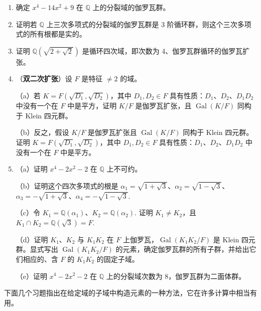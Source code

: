 \begin{enumerate}
\item 确定 \(x^4-14x^2+9\) 在 \(\mathbb{Q}\) 上的分裂域的伽罗瓦群。

\item 证明若 \(\mathbb{Q}\) 上三次多项式的分裂域的伽罗瓦群是 3 阶循环群，则这个三次多项式的所有根都是实的。

\item 证明 \(\mathbb{Q}(\sqrt{2+\sqrt{2}})\) 是循环四次域，即次数为 4、伽罗瓦群循环的伽罗瓦扩张。

\item （\textbf{双二次扩张}）设 \(F\) 是特征 \(\neq 2\) 的域。

（a）若 \(K = F(\sqrt{D_1}, \sqrt{D_2})\)，其中 \(D_1, D_2 \in F\) 具有性质：\(D_1\)、\(D_2\)、\(D_1D_2\) 中没有一个在 \(F\) 中是平方，证明 \(K/F\) 是伽罗瓦扩张，且 \(\operatorname{Gal}(K/F)\) 同构于 Klein 四元群。

（b）反之，假设 \(K/F\) 是伽罗瓦扩张且 \(\operatorname{Gal}(K/F)\) 同构于 Klein 四元群。证明 \(K = F(\sqrt{D_1}, \sqrt{D_2})\)，其中 \(D_1, D_2 \in F\) 具有性质：\(D_1\)、\(D_2\)、\(D_1D_2\) 中没有一个在 \(F\) 中是平方。

\item （a）证明 \(x^4-2x^2-2\) 在 \(\mathbb{Q}\) 上不可约。

（b）证明这个四次多项式的根是 \(\alpha_1 = \sqrt{1+\sqrt{3}}\)、\(\alpha_2 = \sqrt{1-\sqrt{3}}\)、\(\alpha_3 = -\sqrt{1+\sqrt{3}}\)、\(\alpha_4 = -\sqrt{1-\sqrt{3}}\).

（c）令 \(K_1 = \mathbb{Q}(\alpha_1)\)、\(K_2 = \mathbb{Q}(\alpha_2)\). 证明 \(K_1 \neq K_2\)，且 \(K_1 \cap K_2 = \mathbb{Q}(\sqrt{3}) = F\).

（d）证明 \(K_1\)、\(K_2\) 与 \(K_1K_2\) 在 \(F\) 上伽罗瓦，\(\operatorname{Gal}(K_1K_2/F)\) 是 Klein 四元群。显式写出 \(\operatorname{Gal}(K_1K_2/F)\) 的元素，确定伽罗瓦群的所有子群，并给出它们相应的、含 \(F\) 的 \(K_1K_2\) 的固定子域。

（e）证明 \(x^4-2x^2-2\) 在 \(\mathbb{Q}\) 上的分裂域次数为 8，伽罗瓦群为二面体群。
\end{enumerate}

\noindent 下面几个习题指出在给定域的子域中构造元素的一种方法，它在许多计算中相当有用。

